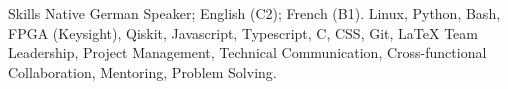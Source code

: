 
\begin{rubric}{Skills}
	\entry*[Languages]
	Native German Speaker; English (C2); French (B1).
	Linux, Python, Bash, FPGA (Keysight), Qiskit, Javascript, Typescript, C, CSS, Git, \LaTeX
	Team Leadership, Project Management, Technical Communication, Cross-functional Collaboration, Mentoring, Problem Solving.
\end{rubric}
